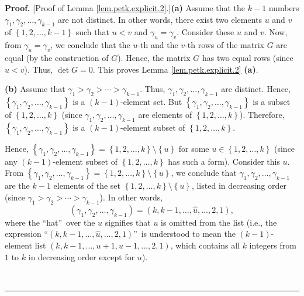 \documentclass[numbers=enddot,12pt,final,onecolumn,notitlepage]{scrartcl}%
\theoremstyle{definition}
\newenvironment{proof}[1][Proof]{\noindent\textbf{#1.} }{\ \rule{0.5em}{0.5em}}
\newenvironment{vershort}{}{}
\begin{document}
\begin{proof}
[Proof of Lemma \ref{lem.petk.explicit.2}.]\textbf{(a)} Assume that the $k-1$
numbers $\gamma_{1},\gamma_{2},\ldots,\gamma_{k-1}$ are not distinct. In other
words, there exist two elements $u$ and $v$ of $\left\{  1,2,\ldots
,k-1\right\}  $ such that $u<v$ and $\gamma_{u}=\gamma_{v}$. Consider these
$u$ and $v$. Now, from $\gamma_{u}=\gamma_{v}$, we conclude that the $u$-th
and the $v$-th rows of the matrix $G$ are equal (by the construction of $G$).
Hence, the matrix $G$ has two equal rows (since $u<v$). Thus, $\det G=0$. This
proves Lemma \ref{lem.petk.explicit.2} \textbf{(a)}.

\textbf{(b)} Assume that $\gamma_{1}>\gamma_{2}>\cdots>\gamma_{k-1}$. Thus,
$\gamma_{1},\gamma_{2},\ldots,\gamma_{k-1}$ are distinct. Hence, $\left\{
\gamma_{1},\gamma_{2},\ldots,\gamma_{k-1}\right\}  $ is a $\left(  k-1\right)
$-element set. But $\left\{  \gamma_{1},\gamma_{2},\ldots,\gamma
_{k-1}\right\}  $ is a subset of $\left\{  1,2,\ldots,k\right\}  $ (since
$\gamma_{1},\gamma_{2},\ldots,\gamma_{k-1}$ are elements of $\left\{
1,2,\ldots,k\right\}  $). Therefore, $\left\{  \gamma_{1},\gamma_{2}%
,\ldots,\gamma_{k-1}\right\}  $ is a $\left(  k-1\right)  $-element subset of
$\left\{  1,2,\ldots,k\right\}  $.

\begin{vershort}
Hence, $\left\{  \gamma_{1},\gamma_{2},\ldots,\gamma_{k-1}\right\}  =\left\{
1,2,\ldots,k\right\}  \setminus\left\{  u\right\}  $ for some $u\in\left\{
1,2,\ldots,k\right\}  $ (since any $\left(  k-1\right)  $-element subset of
$\left\{  1,2,\ldots,k\right\}  $ has such a form). Consider this $u$. From
$\left\{  \gamma_{1},\gamma_{2},\ldots,\gamma_{k-1}\right\}  =\left\{
1,2,\ldots,k\right\}  \setminus\left\{  u\right\}  $, we conclude that
$\gamma_{1},\gamma_{2},\ldots,\gamma_{k-1}$ are the $k-1$ elements of the set
$\left\{  1,2,\ldots,k\right\}  \setminus\left\{  u\right\}  $, listed in
decreasing order (since $\gamma_{1}>\gamma_{2}>\cdots>\gamma_{k-1}$). In other
words,%
\begin{equation}
\left(  \gamma_{1},\gamma_{2},\ldots,\gamma_{k-1}\right)  =\left(
k,k-1,\ldots,\widehat{u},\ldots,2,1\right)  ,
\label{pf.lem.petk.explicit.2.b.short.2}%
\end{equation}
where the \textquotedblleft hat\textquotedblright\ over the $u$ signifies that
$u$ is omitted from the list (i.e., the expression \textquotedblleft$\left(
k,k-1,\ldots,\widehat{u},\ldots,2,1\right)  $\textquotedblright\ is understood
to mean the $\left(  k-1\right)  $-element list $\left(  k,k-1,\ldots
,u+1,u-1,\ldots,2,1\right)  $, which contains all $k$ integers from $1$ to $k$
in decreasing order except for $u$).
\end{vershort}


\end{proof}
\end{document}
